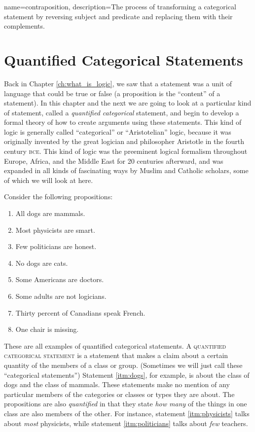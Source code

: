 {
name=contraposition,
description={The process of transforming a categorical statement by reversing subject and predicate and replacing them with their complements.}
}

\section{Quantified Categorical Statements}
\label{sec:qcatstatements}

Back in Chapter \ref{ch:what_is_logic}, we saw that a statement was a unit of language that could be true or false (a proposition is the ``content'' of a statement). In this chapter and the next we are going to look at a particular kind of statement, called a \emph{quantified categorical} statement, and begin to develop a formal theory of how to create arguments using these statements. This kind of logic is generally called ``categorical'' or ``Aristotelian'' logic, because it was originally invented by the great logician and philosopher Aristotle in the fourth century \textsc{bce}. This kind of logic was the preeminent logical formalism throughout Europe, Africa, and the Middle East for 20 centuries afterward, and was expanded in all kinds of fascinating ways by Muslim and Catholic scholars, some of which we will look at here.

Consider the following propositions:

\begin{enumerate}[label=(\alph*)]
    \item \label{itm:dogs} All dogs are mammals.
    \item \label{itm:physicists} Most physicists are smart.
    \item \label{itm:politicians} Few politicians are honest.
    \item \label{itm:no_dogs} No dogs are cats.
    \item \label{itm:americans} Some Americans are doctors.
    \item \label{itm:adults}Some adults are not logicians.
    \item \label{itm:canadians} Thirty percent of Canadians speak French.
    \item \label{itm:chair} One chair is missing.
\end{enumerate}



These are all examples of quantified categorical statements. A  \textsc{\gls{quantified categorical statement}} \label{def:quantified_categorical_statement} is a statement that makes a claim about a certain quantity of the members of a class or group. (Sometimes we will just call these ``categorical statements'') Statement \ref{itm:dogs}, for example, is about the class of dogs and the class of mammals. These statements make no mention of any particular members of the categories or classes or types they are about. The propositions are also \textit{quantified} in that they state \textit{how many} of the things in one class are also members of the other. For instance, statement \ref{itm:physicists} talks about \textit{most} physicists, while statement \ref{itm:politicians} talks about \textit{few} teachers.

